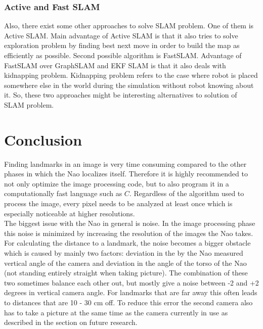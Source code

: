 \documentclass{ba-kecs}
\numberwithin{figure}{section}
\numberwithin{equation}{section}
\begin{document}
\subsubsection{Active and Fast SLAM}
Also, there exist some other approaches to solve SLAM problem. One of them is Active SLAM. Main advantage of Active SLAM is that it also tries to solve exploration problem by finding best next move in order to build the map as efficiently as possible. Second possible algorithm is FastSLAM. Advantage of FastSLAM over GraphSLAM and EKF SLAM is that it also deals with kidnapping problem. Kidnapping problem refers to the case where robot is placed somewhere else in the world during the simulation without robot knowing about it. So, these two approaches might be interesting alternatives to solution of SLAM problem.

\section{Conclusion}

Finding landmarks in an image is very time consuming compared to the other phases in which the Nao localizes itself. Therefore it is highly recommended to not only optimize the image processing code, but to also program it in a computationally fast language such as $\textit{C}$. Regardless of the algorithm used to process the image, every pixel needs to be analyzed at least once which is especially noticeable at higher resolutions. \\

The biggest issue with the Nao in general is noise. In the image processing phase this noise is minimized by increasing the resolution of the images the Nao takes. For calculating the distance to a landmark, the noise becomes a bigger obstacle which is caused by mainly two factors: deviation in the by the Nao measured vertical angle of the camera and deviation in the angle of the torso of the Nao (not standing entirely straight when taking picture).
The combination of these two sometimes balance each other out, but mostly give a noise between -2 and +2 degrees in vertical camera angle. For landmarks that are far away this often leads to distances that are 10 - 30 cm off. To reduce this error the second camera also has to take a picture at the same time as the camera currently in use as described in the section on future research. 

\end{document}
